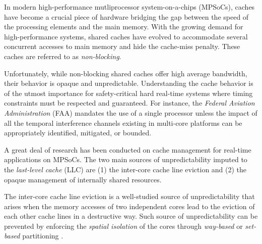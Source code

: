 
    In modern high-performance mutliprocessor system-on-a-chips (MPSoCs), caches have become a crucial piece of hardware bridging the gap between the speed of the processing elements and the main memory.
    With the growing demand for high-performance systems, shared caches have evolved to accommodate several concurrent accesses to main memory and hide the cache-miss penalty.
    These caches are referred to as \emph{non-blocking}.

    Unfortunately, while non-blocking shared caches offer high average bandwidth, their behavior is opaque and unpredictable.
    Understanding the cache behavior is of the utmost importance for safety-critical hard real-time systems where timing constraints must be respected and guaranteed.
    For instance, the \emph{Federal Aviation Administration} (FAA) mandates the use of a single processor unless the impact of all the temporal interference channels existing in multi-core platforms can be appropriately identified, mitigated, or bounded.

    A great deal of research has been conducted on cache management for real-time applications on MPSoCs.
    The two main sources of unpredictability imputed to the \emph{last-level cache} (LLC) are (1) the inter-core cache line eviction and (2) the opaque management of internally shared resources.

    The inter-core cache line eviction is a well-studied source of unpredictability that arises when the memory accesses of two independent cores lead to the eviction of each other cache lines in a destructive way.
    Such source of unpredictability can be prevented by enforcing the \emph{spatial isolation} of the cores through \emph{way-based} or \emph{set-based} partitioning \cite{Mancuso2013RealtimeCM, 6755286, Giovani_cahe_partitioning_survey}.


